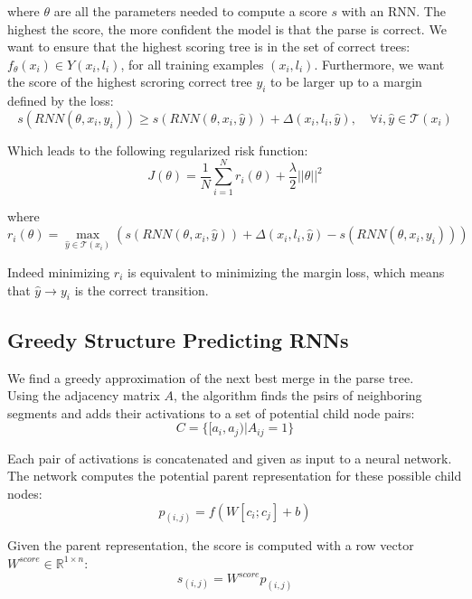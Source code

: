 where $\theta$ are all the parameters needed to compute a score $s$ with an RNN.
The highest the score, the more confident the model is that the parse is
correct. 
We want to ensure that the highest scoring tree is in the set of
correct trees: $f_{\theta}(x_i) \in Y(x_i, l_i)$, for all training examples
$(x_i, l_i)$.
Furthermore, we want the score of the highest scroring correct tree $y_i$ to be
larger up to a margin defined by the loss: 
\begin{equation}
	s(RNN(\theta, x_i, y_i)) \geq s(RNN(\theta, x_i, \hat{y})) 
	+ \Delta(x_i, l_i, \hat{y}), \quad \forall i, \hat{y} \in \mathcal{T}(x_i)
\end{equation}

Which leads to the following regularized risk function:
\begin{equation}
	J(\theta) = \frac{1}{N} \sum_{i=1}^{N} r_i(\theta) +
	\frac{\lambda}{2}||\theta||^2
\end{equation}

where
\begin{equation}
	\label{eq:margin_loss}
	r_i(\theta) = \max_{\hat{y} \in \mathcal{T}(x_i)} \left( s(RNN(\theta, x_i,
	\hat{y})) + \Delta(x_i, l_i, \hat{y}) - s(RNN(\theta, x_i, y_i)) \right)
\end{equation}

Indeed minimizing $r_i$ is equivalent to minimizing the margin loss, which means
that $\hat{y} \rightarrow y_i$ is the correct transition.

\subsection{Greedy Structure Predicting RNNs}

We find a greedy approximation of the next best merge in the parse tree.\\
Using the adjacency matrix $A$, the algorithm finds the psirs of neighboring
segments and adds their activations to a set of potential child node pairs:
\begin{equation}
	C = \{ [a_i, a_j) | A_{ij} = 1 \}
\end{equation}

Each pair of activations is concatenated and given as input to a neural network.
The network computes the potential parent representation for these possible
child nodes:
\begin{equation}
	p_{(i,j)} = f(W[c_i; c_j] + b)
\end{equation}

Given the parent representation, the score is computed with a row vector
$W^{score} \in \mathbb{R}^{1 \times n}$:
\begin{equation}
	s_{(i,j)} = W^{score} p_{(i,j)}
\end{equation}

